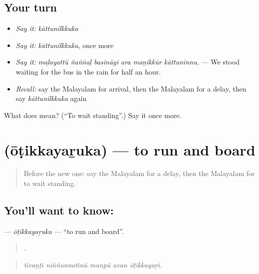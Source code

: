 \subsection*{Your turn}
\begin{itemize}
\raggedright
  \item \emph{Say it:} \emph{kāttunilkkuka}
  \item \emph{Say it:} \emph{kāttunilkkuka}, once more
  \item \emph{Say it:} \emph{maḻayattŭ ñaṅṅaḷ basināyi ara maṇikkūr kāttuninnu.} — We stood waiting for the bus in the rain for half an hour.
  \item \emph{Recall:} say the Malayalam for arrival, then the Malayalam for a delay, then say \emph{kāttunilkkuka} again
\end{itemize}

\begin{tcolorbox}[breakable,colback=teal!4,colframe=teal!35!black,title={Before you move on}]
What does  mean? (\textquotedblleft{}To wait standing\textquotedblright{}.) Say it once more.
\end{tcolorbox}
\section[\texorpdfstring{\ml{ഓടിക്കയറുക} (ōṭikkayaṟuka)}{ഓടിക്കയറുക (ōṭikkayaṟuka)}]{ (ōṭikkayaṟuka) — to run and board}

\label{lesson:ML-C465-otikkayaruka}



\begin{quote}
Before the new one: say the Malayalam for a delay, then the Malayalam for to wait standing.
\end{quote}

\subsection*{You'll want to know: }
\textbf{} — \emph{ōṭikkayaṟuka} — \textquotedblleft{}to run and board\textquotedblright{}.

\begin{quote}
    .
\end{quote}

\begin{quote}
\emph{tīvaṇṭi nīṅṅunnatinŭ munpŭ avan ōṭikkayaṟi.}
\end{quote}

